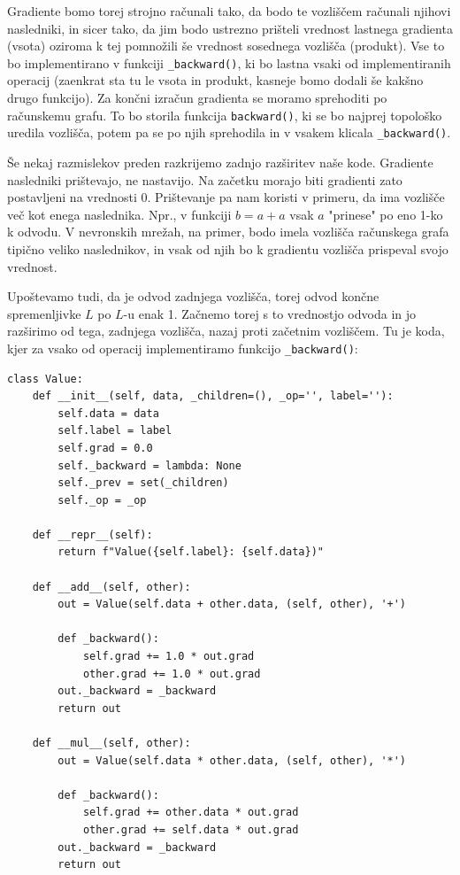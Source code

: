 Gradiente bomo torej strojno računali tako, da bodo te vozliščem računali njihovi nasledniki, in sicer tako, da jim bodo ustrezno prišteli vrednost lastnega gradienta (vsota) oziroma k tej pomnožili še vrednost sosednega vozlišča (produkt). Vse to bo implementirano v funkciji \texttt{\_backward()}, ki bo lastna vsaki od implementiranih operacij (zaenkrat sta tu le vsota in produkt, kasneje bomo dodali še kakšno drugo funkcijo). Za končni izračun gradienta se moramo sprehoditi po računskemu grafu. To bo storila funkcija \texttt{backward()}, ki se bo najprej topološko uredila vozlišča, potem pa se po njih sprehodila in v vsakem klicala \texttt{\_backward()}.

Še nekaj razmislekov preden razkrijemo zadnjo razširitev naše kode. Gradiente nasledniki prištevajo, ne nastavijo. Na začetku morajo biti gradienti zato postavljeni na vrednosti 0. Prištevanje pa nam koristi v primeru, da ima vozlišče več kot enega naslednika. Npr., v funkciji \( b = a + a \) vsak \( a \) "prinese" po eno 1-ko k odvodu. V nevronskih mrežah, na primer, bodo imela vozlišča računskega grafa tipično veliko naslednikov, in vsak od njih bo k gradientu vozlišča prispeval svojo vrednost. 

Upoštevamo tudi, da je odvod zadnjega vozlišča, torej odvod končne spremenljivke \( L \) po \( L \)-u enak 1. Začnemo torej s to vrednostjo odvoda in jo razširimo od tega, zadnjega vozlišča, nazaj proti začetnim vozliščem. Tu je koda, kjer za vsako od operacij implementiramo funkcijo \texttt{\_backward()}:

\vspace*{3mm}
\begin{lstlisting}
class Value:
    def __init__(self, data, _children=(), _op='', label=''):
        self.data = data
        self.label = label
        self.grad = 0.0
        self._backward = lambda: None
        self._prev = set(_children)
        self._op = _op

    def __repr__(self):
        return f"Value({self.label}: {self.data})"
    
    def __add__(self, other):
        out = Value(self.data + other.data, (self, other), '+')

        def _backward():
            self.grad += 1.0 * out.grad
            other.grad += 1.0 * out.grad
        out._backward = _backward
        return out
    
    def __mul__(self, other):
        out = Value(self.data * other.data, (self, other), '*')

        def _backward():
            self.grad += other.data * out.grad
            other.grad += self.data * out.grad
        out._backward = _backward
        return out
\end{lstlisting}

